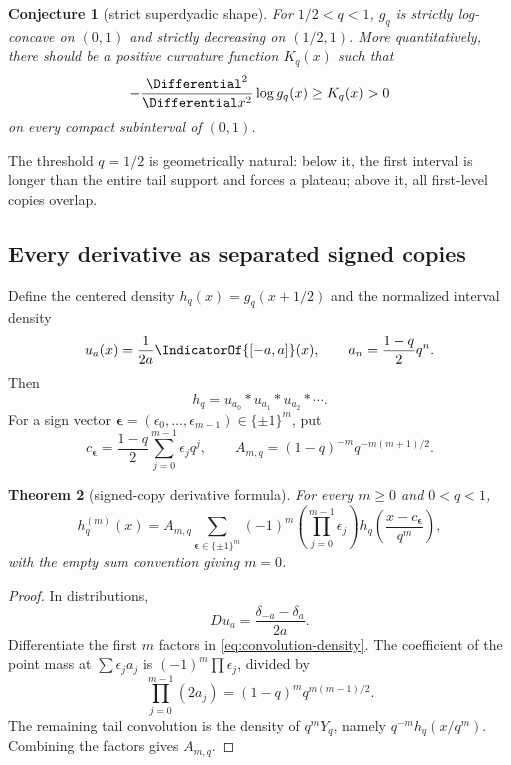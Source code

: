 \documentclass[11pt,oneside]{article}
\newtheorem{theorem}{Theorem}[section]
\newtheorem{conjecture}[theorem]{Conjecture}
\theoremstyle{definition}
\theoremstyle{remark}
\begin{document}
\begin{conjecture}[strict superdyadic shape]\label{conj:strict-logconcavity}
For $1/2<q<1$, $g_q$ is strictly log-concave on $(0,1)$ and strictly decreasing on $(1/2,1)$.  More quantitatively, there should be a positive curvature function $K_q(x)$ such that
\[
 -\frac{\Differential^2}{\Differential x^2}\log g_q(x)\ge K_q(x)>0
\]
on every compact subinterval of $(0,1)$.
\end{conjecture}

The threshold $q=1/2$ is geometrically natural: below it, the first interval is longer than the entire tail support and forces a plateau; above it, all first-level copies overlap.

\subsection{Every derivative as separated signed copies}

Define the centered density $h_q(x)=g_q(x+1/2)$ and the normalized interval density
\[
 u_a(x)=\frac{1}{2a}\IndicatorOf{[-a,a]}(x),
 \qquad a_n=\frac{1-q}{2}q^n.
\]
Then
\begin{equation}\label{eq:convolution-density}
 h_q=u_{a_0}*u_{a_1}*u_{a_2}*\cdots.
\end{equation}
For a sign vector $\bm\epsilon=(\epsilon_0,\ldots,\epsilon_{m-1})\in\{\pm1\}^m$, put
\begin{equation}\label{eq:centers}
 c_{\bm\epsilon}=\frac{1-q}{2}\sum_{j=0}^{m-1}\epsilon_jq^j,
 \qquad
 A_{m,q}=(1-q)^{-m}q^{-m(m+1)/2}.
\end{equation}

\begin{theorem}[signed-copy derivative formula]\label{thm:derivative-copies}
For every $m\ge0$ and $0<q<1$,
\begin{equation}\label{eq:derivative-copies}
 h_q^{(m)}(x)=A_{m,q}
 \sum_{\bm\epsilon\in\{\pm1\}^m}
 (-1)^m\left(\prod_{j=0}^{m-1}\epsilon_j\right)
 h_q\!\left(\frac{x-c_{\bm\epsilon}}{q^m}\right),
\end{equation}
with the empty sum convention giving $m=0$.
\end{theorem}

\begin{proof}
In distributions,
\[
 D u_a=\frac{\delta_{-a}-\delta_a}{2a}.
\]
Differentiate the first $m$ factors in \cref{eq:convolution-density}.  The coefficient of the point mass at $\sum\epsilon_ja_j$ is $(-1)^m\prod\epsilon_j$, divided by
\[
 \prod_{j=0}^{m-1}(2a_j)=(1-q)^mq^{m(m-1)/2}.
\]
The remaining tail convolution is the density of $q^mY_q$, namely $q^{-m}h_q(x/q^m)$.  Combining the factors gives $A_{m,q}$.
\end{proof}
\end{document}
